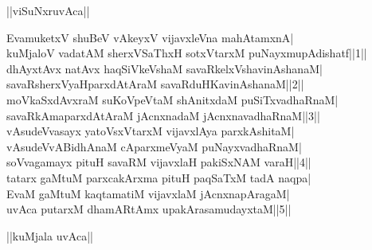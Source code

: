 \documentclass{article}
\begin{document}
\begin{center}
||viSuNxruvAca||
\end{center}

EvamuketxV shuBeV vAkeyxV vijavxleVna mahAtamxnA|\\
kuMjaloV vadatAM sherxVSaThxH sotxVtarxM puNayxmupAdishatf||1||\\
dhAyxtAvx natAvx haqSiVkeVshaM savaRkelxVshavinAshanaM|\\
savaRsherxVyaHparxdAtAraM savaRduHKavinAshanaM||2||\\
moVkaSxdAvxraM suKoVpeVtaM shAnitxdaM puSiTxvadhaRnaM|\\
savaRkAmaparxdAtAraM jAcnxnadaM jAcnxnavadhaRnaM||3||\\
vAsudeVvasayx yatoVsxVtarxM vijavxlAya parxkAshitaM|\\
vAsudeVvABidhAnaM cAparxmeVyaM puNayxvadhaRnaM|\\
soVvagamayx pituH savaRM vijavxlaH pakiSxNAM varaH||4||\\
tatarx gaMtuM parxcakArxma pituH paqSaTxM tadA naqpa|\\
EvaM gaMtuM kaqtamatiM vijavxlaM jAcnxnapAragaM|\\
uvAca putarxM dhamARtAmx upakArasamudayxtaM||5||\\

\begin{center}
||kuMjala uvAca||
\end{center}
\end{document}
